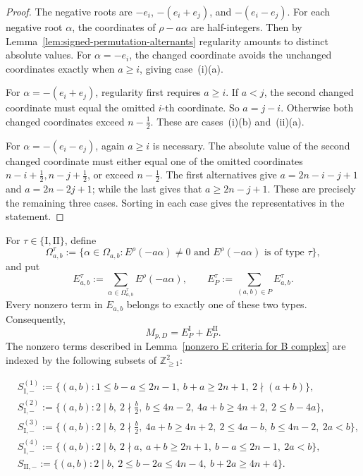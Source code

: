 \documentclass[11pt,a4paper]{amsart}
\newcommand{\ZZ}{\mathbb Z}
\theoremstyle{plain}
\numberwithin{equation}{section}
\def\leq{\leqslant}
\def\geq{\geqslant}
\newenvironment{pf}{\begin{proof}}{\end{proof}}
\begin{document}
\begin{pf}
The negative roots are \(-e_i\), \(-(e_i+e_j)\), and
\(-(e_i-e_j)\). For each negative root \(\alpha\), the coordinates of
\(\rho-a\alpha\) are half-integers. Then by
Lemma~\ref{lem:signed-permutation-alternants} regularity amounts to
distinct absolute values.
For \(\alpha=-e_i\), the changed coordinate avoids the unchanged
coordinates exactly when \(a\ge i\), giving case~(i)(a).

For \(\alpha=-(e_i+e_j)\), regularity first requires \(a\ge i\).
If \(a<j\), the second changed coordinate must equal the omitted
\(i\)-th coordinate. So \(a=j-i\). Otherwise both changed
coordinates exceed \(n-\tfrac12\). These are cases~(i)(b) and~(ii)(a).

For \(\alpha=-(e_i-e_j)\), again \(a\ge i\) is necessary.
The absolute value of the second changed coordinate must either equal
one of the omitted coordinates \(n-i+\tfrac12,n-j+\tfrac12\),
or exceed \(n-\tfrac12\). The first alternatives give
\(a=2n-i-j+1\) and \(a=2n-2j+1\); while the last gives that
\(a\ge2n-j+1\). These are precisely the remaining three cases.
Sorting in each case gives the representatives in the statement.
\end{pf}
For \(\tau\in\{\mathrm{I},\mathrm{II}\}\), define
\[
\Omega_{a,b}^{\tau}
:=\{\alpha\in\Omega_{a,b}:
E^\rho(-a\alpha)\ne0
\text{ and }E^\rho(-a\alpha)\text{ is of type }\tau\},
\]
and put
\[
E_{a,b}^{\tau}
:=\sum_{\alpha\in\Omega_{a,b}^{\tau}}E^\rho(-a\alpha),
\qquad
E_P^{\tau}
:=\sum_{(a,b)\in P}E_{a,b}^{\tau}.
\]
Every nonzero term in \(E_{a,b}\) belongs to exactly one of these two types.
Consequently,
\begin{equation}\label{B-term-decomposition}
M_{p,D}
=E_P^{\mathrm{I}}
+E_P^{\mathrm{II}}.
\end{equation}
The nonzero terms described in Lemma~\ref{nonzero E criteria for B complex}
are indexed by the following subsets of \(\ZZ_{\geq1}^2\):
\begin{center}
\small
\(\displaystyle
\begin{aligned}
&S_{\mathrm{I},-}^{(1)}:=\{(a,b):1\leq b-a\leq 2n-1,\ b+a\geq 2n+1,\ 2\nmid(a+b)\},\\
&S_{\mathrm{I},-}^{(2)}:=\{(a,b):2\mid b,\ 2\nmid \tfrac b2,\ b\leq 4n-2,\ 4a+b\geq 4n+2,\ 2\leq b-4a\},\\
&S_{\mathrm{I},-}^{(3)}:=\{(a,b):2\mid b,\ 2\nmid \tfrac b2,\ 4a+b\geq 4n+2,\ 2\leq4a-b,\ b\leq 4n-2,\ 2a<b\},\\
&S_{\mathrm{I},-}^{(4)}:=\{(a,b):2\mid b,\ 2\nmid a,\ a+b\geq 2n+1,\ b-a\leq 2n-1,\ 2a<b\},\\
&S_{\mathrm{II},-}:=\{(a,b):2\mid b,\ 2\leq b-2a\leq 4n-4,\ b+2a\geq 4n+4\}.
\end{aligned}
\)
\end{center}
\end{document}
